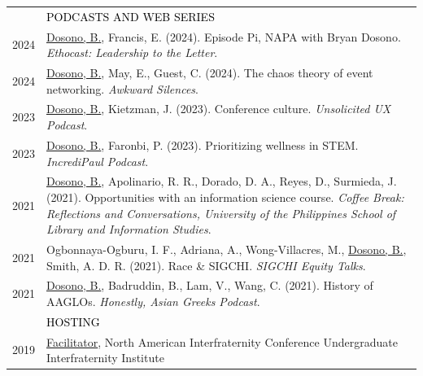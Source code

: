 \documentclass[12pt]{article}
\begin{document}
{\begin{longtable}{R{0.75in}p{5.0in}}
& \large \textcolor{black}{\uppercase{Podcasts and Web Series}}\\
\footnotesize{2024} &
\href{https://zencastr.com/z/MDerKjSE}{Dosono, B.}, Francis, E. (2024). Episode Pi, NAPA with Bryan Dosono. \textit{Ethocast: Leadership to the Letter}.\\

\footnotesize{2024} &
\href{https://podcast.userinterviews.com/episodes/141-the-chaos-theory-of-event-networking-with-bryan-dosono-of-ebay}{Dosono, B.}, May, E., Guest, C. (2024). The chaos theory of event networking. \textit{Awkward Silences}.\\

\footnotesize{2023} &
\href{https://unsolicitedux.substack.com/p/s1e12-bryan-dosono-conference-culture}{Dosono, B.}, Kietzman, J. (2023). Conference culture. \textit{Unsolicited UX Podcast}.\\

\footnotesize{2023} &
\href{https://podcasters.spotify.com/pod/show/incredipaul/episodes/Episode-36-Prioritizing-Wellness-in-STEM-w-Bryan-Dosono--PhD-e27qo7c}{Dosono, B.}, Faronbi, P. (2023). Prioritizing wellness in STEM. \textit{IncrediPaul Podcast}. \\

\footnotesize{2021} &
\href{https://www.youtube.com/watch?v=CPGFnCFnm1s&ab_channel=UPSLIS}{Dosono, B.}, Apolinario, R. R., Dorado, D. A., Reyes, D., Surmieda, J. (2021). Opportunities with an information science course. \textit{Coffee Break: Reflections and Conversations, University of the Philippines School of Library and Information Studies}. \\

\footnotesize{2021} &
Ogbonnaya-Ogburu, I. F., Adriana, A., Wong-Villacres, M., \href{https://www.youtube.com/watch?v=n4El4VcPcVQ&list=PLqhXYFYmZ-VdgN7nr6KoCgtsT5x_Owr2Q&index=10&ab_channel=ACMSIGCHI}{Dosono, B.}, Smith, A. D. R. (2021). Race \& SIGCHI. \textit{SIGCHI Equity Talks}. \\

\footnotesize{2021} &
\href{https://anchor.fm/honestly-asian-greeks/episodes/Episode-1-History-of-AAGLOs-eok3em}{Dosono, B.}, Badruddin, B., Lam, V., Wang, C. (2021). History of AAGLOs. \textit{Honestly, Asian Greeks Podcast}. \medskip \\

& \large \textcolor{black}{\uppercase{Hosting}}\\

\footnotesize{2019} & \href{https://aflv.org/uifi}{Facilitator}, North American Interfraternity Conference Undergraduate Interfraternity Institute\\


\end{longtable}}
\end{document}
